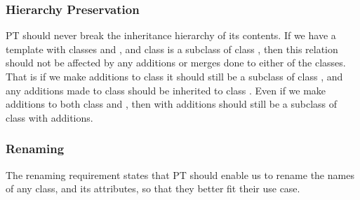 \subsubsection{Hierarchy Preservation}\label{subsubsec:hierachy-preservation}
%
PT should never break the inheritance hierarchy of its contents.
If we have a template with classes  and , and class  is a subclass of class , then this relation should not be affected by any additions or merges done to either of the classes.
That is if we make additions to class  it should still be a subclass of class , and any additions made to class  should be inherited to class .
Even if we make additions to both class  and , then  with additions should still be a subclass of class  with additions.

\subsubsection{Renaming}\label{subsubsec:renaming2}

%

The renaming requirement states that PT should enable us to rename the names of any class, and its attributes, so that they better fit their use case.

